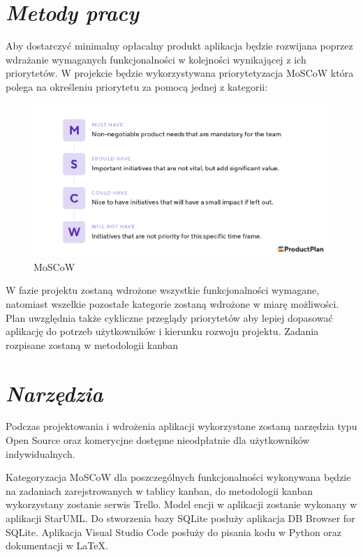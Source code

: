 \documentclass[a4paper,10pt]{report}
\newcommand{\customstylesection}[1]{\textbf{\textit{#1}}}
\begin{document}
\section{\customstylesection{Metody pracy}}
{Aby dostarczyć minimalny opłacalny produkt \cite{MVP} aplikacja będzie 
rozwijana poprzez wdrażanie wymaganych funkcjonalności w kolejności wynikającej 
z ich priorytetów. W projekcie będzie wykorzystywana priorytetyzacja MoSCoW 
\cite{MOSCOW} która polega na określeniu priorytetu za pomocą jednej z kategorii:
\begin{figure}[H]           %
    \caption{MoSCoW}
    \label{fig:MoSCoW}
    \centering  
    \includegraphics[width=12cm]{figures/MoSCoW-01.png}
\end{figure}
W fazie projektu zostaną wdrożone wszystkie funkcjonalności wymagane, natomiast  
wszelkie pozostałe kategorie zostaną wdrożone w miarę możliwości. Plan 
uwzględnia także cykliczne przeglądy priorytetów aby lepiej dopasować aplikację 
do potrzeb użytkowników i kierunku rozwoju projektu. Zadania rozpisane zostaną 
w metodologii kanban}

\section{\customstylesection{Narzędzia}}
{Podczas projektowania i wdrożenia aplikacji wykorzystane zostaną narzędzia typu
 Open Source oraz komerycjne dostępne nieodpłatnie dla użytkowników 
indywidualnych.}

{Kategoryzacja MoSCoW dla poszczególnych funkcjonalności wykonywana będzie na 
zadaniach zarejstrowanych w tablicy kanban, do metodologii kanban wykorzystany 
zostanie serwis Trello. Model encji w aplikacji zostanie wykonany w aplikacji 
StarUML. Do stworzenia bazy SQLite posłuży aplikacja DB Browser for SQLite. 
Aplikacja Visual Studio Code posłuży do pisania kodu w Python oraz dokumentacji 
w LaTeX.}
\end{document}

